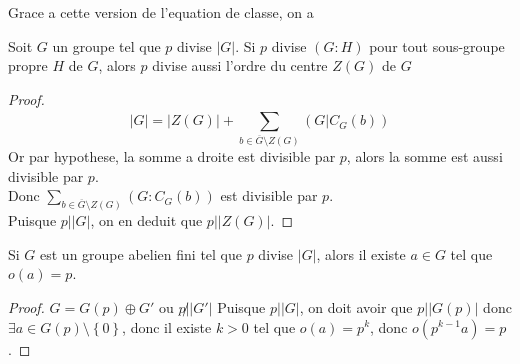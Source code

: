 \documentclass[../main.tex]{subfiles}
\begin{document}
Grace a cette version de l'equation de classe, on a 
\begin{lemma}
Soit $G$ un groupe tel que $p$ divise $|G|$. Si $p$ divise $( G:H) $ pour tout sous-groupe propre $H$ de $G$, alors $p$ divise aussi l'ordre du centre $Z( G) $ de $G$ 	
\end{lemma}
\begin{proof}
\[ 
|G| = |Z( G) | + \sum_{b \in \overline{G}\setminus Z( G) }^{ }( G|C_G( b) ) 
\]
Or par hypothese, la somme a droite est divisible par $p$, alors la somme est aussi divisible par $p$.\\
Donc $ \sum_{b\in \overline{G}\setminus Z( G) }^{ } ( G:C_G( b) ) $ est divisible par $p$.\\
Puisque $p||G|$, on en deduit que $p|  |Z( G) |$.

\end{proof}
\begin{lemma}
Si $G$ est un groupe abelien fini tel que $p$ divise $|G|$, alors il existe $a\in G$ tel que $o( a) = p$.
\end{lemma}
\begin{proof}
$G = G( p) \oplus G'$ ou $p\not||G'|$ Puisque $p| |G|$, on doit avoir que $p| |G( p) |$ donc $\exists a \in G( p) \setminus \left\{ 0 \right\} $, donc il existe $k>0$ tel que $o( a) = p^{k}$, donc $o( p^{k-1}a) = p$.
\end{proof}
\end{document}
